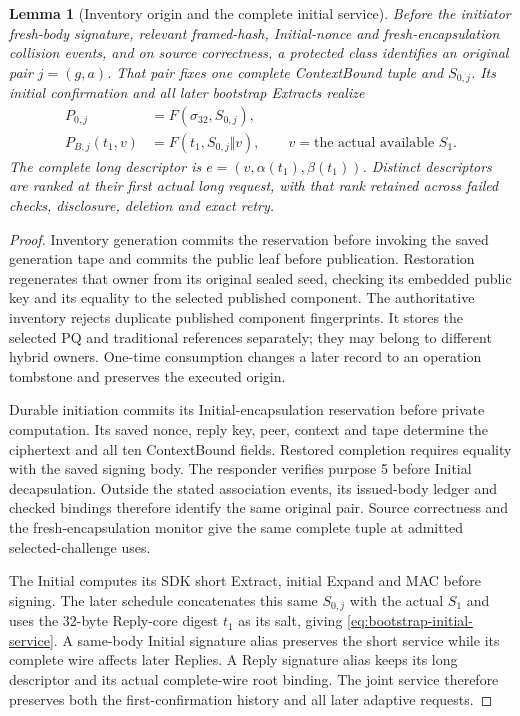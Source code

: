 \documentclass[pdflatex]{sn-jnl}
\theoremstyle{thmstyleone}
\newtheorem{lemma}[theorem]{Lemma}
\theoremstyle{thmstylethree}
\theoremstyle{thmstyletwo}
\begin{document}
\begin{lemma}[Inventory origin and the complete initial service]
\label{lem:bootstrap-initial-origin}
Before the initiator fresh-body signature, relevant framed-hash,
Initial-nonce and fresh-encapsulation collision events, and on source
correctness, a protected class identifies an original pair $j=(g,a)$.
That pair fixes one complete ContextBound tuple and $S_{0,j}$. Its
initial confirmation and all later bootstrap Extracts realize
\begin{equation}
 \begin{aligned}
 P_{0,j}&=F(\sigma_{32},S_{0,j}),\\
 P_{B,j}(t_1,v)&=F(t_1,S_{0,j}\Vert v),
       \qquad v=\text{the actual available }S_1.
 \end{aligned}
 \label{eq:bootstrap-initial-service}
\end{equation}
The complete long descriptor is
$e=(v,\alpha(t_1),\beta(t_1))$. Distinct descriptors are ranked at their
first actual long request, with that rank retained across failed checks,
disclosure, deletion and exact retry.
\end{lemma}
\begin{proof}
Inventory generation commits the reservation before invoking the saved
generation tape and commits the public leaf before publication. Restoration
regenerates that owner from its original sealed seed, checking its embedded
public key and its equality to the selected published component. The
authoritative inventory rejects duplicate published component fingerprints.
It stores the selected PQ and traditional references separately; they may
belong to different hybrid owners. One-time consumption changes a later
record to an operation tombstone and preserves the executed origin.

Durable initiation commits its Initial-encapsulation reservation before
private computation. Its saved nonce, reply key, peer, context and tape
determine the ciphertext and all ten ContextBound fields. Restored
completion requires equality with the saved signing body. The responder
verifies purpose 5 before Initial decapsulation. Outside the stated
association events, its issued-body ledger and checked bindings therefore
identify the same original pair. Source correctness and the
fresh-encapsulation monitor give the same complete tuple at admitted
selected-challenge uses.

The Initial computes its SDK short Extract, initial Expand and MAC before
signing. The later schedule concatenates this same $S_{0,j}$ with the
actual $S_1$ and uses the 32-byte Reply-core digest $t_1$ as its salt, giving
\eqref{eq:bootstrap-initial-service}. A same-body Initial signature alias
preserves the short service while its complete wire affects later Replies.
A Reply signature alias keeps its long descriptor and its actual
complete-wire root binding. The joint service therefore preserves both
the first-confirmation history and all later adaptive requests.
\end{proof}
\end{document}
